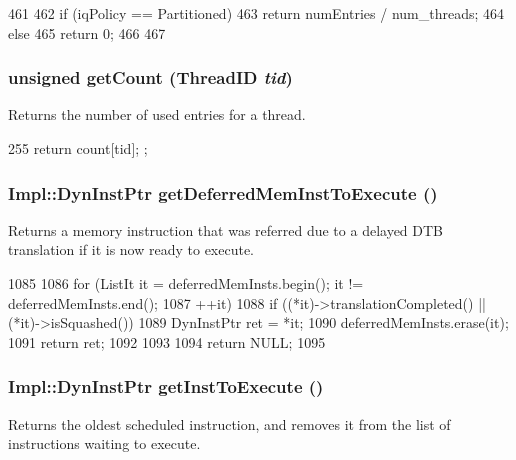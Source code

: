 \begin{DoxyCode}
461 {
462     if (iqPolicy == Partitioned) {
463         return numEntries / num_threads;
464     } else {
465         return 0;
466     }
467 }
\end{DoxyCode}
\hypertarget{classInstructionQueue_aaf7eb96b7ab2a8240d043b7d82494d15}{
\subsubsection[{getCount}]{\setlength{\rightskip}{0pt plus 5cm}unsigned getCount ({\bf ThreadID} {\em tid})}}
\label{classInstructionQueue_aaf7eb96b7ab2a8240d043b7d82494d15}
Returns the number of used entries for a thread. 


\begin{DoxyCode}
255 { return count[tid]; };
\end{DoxyCode}
\hypertarget{classInstructionQueue_ae2aedd3b5257ee38cb5a4e307d2d50a5}{
\subsubsection[{getDeferredMemInstToExecute}]{\setlength{\rightskip}{0pt plus 5cm}Impl::DynInstPtr getDeferredMemInstToExecute ()}}
\label{classInstructionQueue_ae2aedd3b5257ee38cb5a4e307d2d50a5}
Returns a memory instruction that was referred due to a delayed DTB translation if it is now ready to execute. 


\begin{DoxyCode}
1085 {
1086     for (ListIt it = deferredMemInsts.begin(); it != deferredMemInsts.end();
1087          ++it) {
1088         if ((*it)->translationCompleted() || (*it)->isSquashed()) {
1089             DynInstPtr ret = *it;
1090             deferredMemInsts.erase(it);
1091             return ret;
1092         }
1093     }
1094     return NULL;
1095 }
\end{DoxyCode}
\hypertarget{classInstructionQueue_acf940a475d9687f26e8ab8a98c244f08}{
\subsubsection[{getInstToExecute}]{\setlength{\rightskip}{0pt plus 5cm}Impl::DynInstPtr getInstToExecute ()}}
\label{classInstructionQueue_acf940a475d9687f26e8ab8a98c244f08}
Returns the oldest scheduled instruction, and removes it from the list of instructions waiting to execute. 


